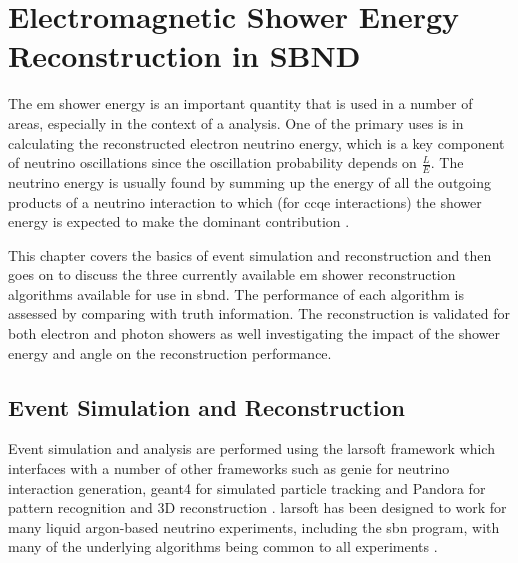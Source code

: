 \chapter{Electromagnetic Shower Energy Reconstruction in SBND}
\label{chap:Energy_Reco}

The \gls{em} shower energy is an important quantity that is used in a number of areas, especially in the context of a \nue analysis. One of the primary uses is in calculating the reconstructed electron neutrino energy, which is a key component of neutrino oscillations since the oscillation probability depends on $\frac{L}{E}$. The neutrino energy is usually found by summing up the energy of all the outgoing products of a neutrino interaction to which (for \nue \gls{ccqe} interactions) the shower energy is expected to make the dominant contribution \cite{neutrino_energy_reconstruction}. 

This chapter covers the basics of event simulation and reconstruction and then goes on to discuss the three currently available \gls{em} shower reconstruction algorithms available for use in \gls{sbnd}. The performance of each algorithm is assessed by comparing with truth information. The reconstruction is validated for both electron and photon showers as well investigating the impact of the shower energy and angle on the reconstruction performance. 

\section{Event Simulation and Reconstruction}\label{sec:Event Production and Reconstruction}

Event simulation and analysis are performed using the \gls{larsoft} framework which interfaces with a number of other frameworks such as \gls{genie} for neutrino interaction generation, \gls{geant4} for simulated particle tracking and Pandora for pattern recognition and 3D reconstruction \cite{GENIE}\cite{Geant4_website}\cite{Geant4_paper}\cite{Pandora_paper}. \gls{larsoft} has been designed to work for many liquid argon-based neutrino experiments, including the \gls{sbn} program, with many of the underlying algorithms being common to all experiments \cite{larsoft}\cite{larsoft_paper}.

